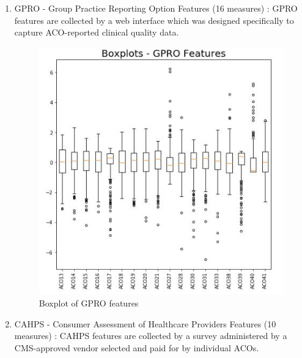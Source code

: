 \documentclass{article}
\begin{document}
\begin{enumerate}
\item GPRO - Group Practice Reporting Option Features (16 measures) : GPRO features are collected by a web interface which was designed specifically to capture ACO-reported clinical quality data.

\begin{figure}[H]
    \centering
    \includegraphics{BoxPlots_GPRO.jpg}
    \caption{Boxplot of GPRO features}
    \label{fig:boxgpro}
\end{figure}


\item CAHPS - Consumer Assessment of Healthcare Providers Features (10 measures) : CAHPS features are collected by a survey administered by a CMS-approved vendor selected and paid for by individual ACOs.


\end{enumerate}
\end{document}
